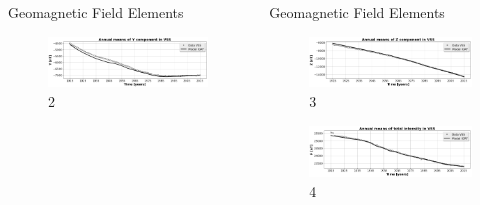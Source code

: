 \documentclass[final,t]{beamer}
\begin{document}
\begin{columns}[t]
\begin{column}{.66\linewidth}
\begin{columns}
\begin{column}{.31\linewidth}
\begin{block}{Geomagnetic Field Elements}
\begin{figure}
\centering
\includegraphics[width=0.9\linewidth, height=0.1\textheight]{"figs_ed/Y mean all_v2"}
\caption{2}

\label{fig:Ymeanall_v2}
\end{figure}


\end{block}

\end{column}

\begin{column}{.31\linewidth}

\begin{block}{Geomagnetic Field Elements}
	
\begin{figure}
\centering
\includegraphics[width=0.8\linewidth, height=0.1\textheight]{"figs_ed/Z mean all_v2"}
\caption{3}
\label{fig:Zmeanall_v2}
\end{figure}

\begin{figure}
\centering
\includegraphics[width=0.8\linewidth, height=0.1\textheight]{"figs_ed/F mean all_v2"}
\caption{4}
\label{fig:Fmeanall_v2}
\end{figure}


\end{block}
\end{column}
\end{columns}
\end{column}
\end{columns}
\end{document}
